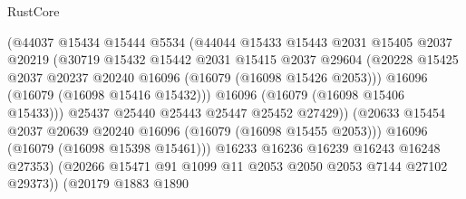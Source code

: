 \begin{lexlean}{RustCore}
\begin{coremodule}
                                    (@44037
                                      @15434
                                      @15444
                                      @5534
                                      (@44044
                                        @15433
                                        @15443
                                        @2031
                                        @15405
                                        @2037
                                        @20219
                                        (@30719
                                          @15432
                                          @15442
                                          @2031
                                          @15415
                                          @2037
                                          @29604
                                          (@20228
                                            @15425
                                            @2037
                                            @20237
                                            @20240
                                            @16096
                                            (@16079 (@16098 @15426 @2053)))
                                          @16096
                                          (@16079 (@16098 @15416 @15432)))
                                        @16096
                                        (@16079 (@16098 @15406 @15433)))
                                      @25437
                                      @25440
                                      @25443
                                      @25447
                                      @25452
                                      @27429))
                                  (@20633
                                    @15454
                                    @2037
                                    @20639
                                    @20240
                                    @16096
                                    (@16079 (@16098 @15455 @2053)))
                                  @16096
                                  (@16079 (@16098 @15398 @15461)))
                                @16233
                                @16236
                                @16239
                                @16243
                                @16248
                                @27353)
                              (@20266 @15471 @91 @1099 @11 @2053 @2050 @2053 @7144 @27102 @29373))
                            (@20179
                              @1883
                              @1890

\end{coremodule}
\end{lexlean}
